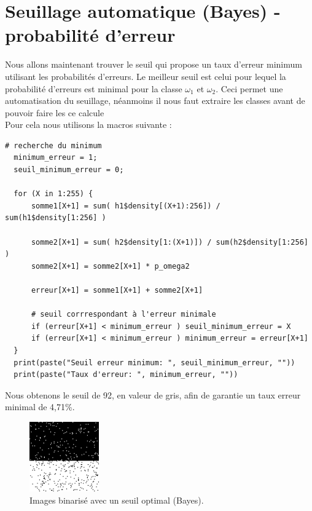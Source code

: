 \documentclass[a4paper,11pt]{article}
\begin{document}
  
  \section{Seuillage automatique (Bayes) - probabilité d’erreur}
  Nous allons maintenant trouver le seuil qui propose un taux d'erreur minimum utilisant 
  les probabilités d'erreurs. Le meilleur seuil est celui pour lequel la probabilité 
  d'erreurs est minimal pour la classe $\omega_1$ et $\omega_2$. Ceci permet une 
  automatisation du seuillage, néanmoins il nous faut extraire les classes avant de pouvoir 
  faire les ce calcule\\
  
  Pour cela nous utilisons la macros suivante :
  
  \begin{lstlisting}[caption=Macros qui recherche le seuil avec le taux d'erreur minimum]
  # recherche du minimum
  minimum_erreur = 1;
  seuil_minimum_erreur = 0;

  for (X in 1:255) { 
      somme1[X+1] = sum( h1$density[(X+1):256]) / sum(h1$density[1:256] )
    
      somme2[X+1] = sum( h2$density[1:(X+1)]) / sum(h2$density[1:256] )
      somme2[X+1] = somme2[X+1] * p_omega2

      erreur[X+1] = somme1[X+1] + somme2[X+1]
      
      # seuil corrrespondant à l'erreur minimale
      if (erreur[X+1] < minimum_erreur ) seuil_minimum_erreur = X
      if (erreur[X+1] < minimum_erreur ) minimum_erreur = erreur[X+1]
  }
  print(paste("Seuil erreur minimum: ", seuil_minimum_erreur, ""))
  print(paste("Taux d'erreur: ", minimum_erreur, ""))\end{lstlisting}
  
  Nous obtenons le seuil de 92, en valeur de gris, afin de garantie un taux erreur minimal 
  de 4,71\%. 
  
  \begin{figure}[H]
    \center
    \includegraphics[width=3cm]{resultat/binBayes.png}
    \caption{Images binarisé avec un seuil optimal (Bayes).}
  \end{figure}
  
\end{document}
